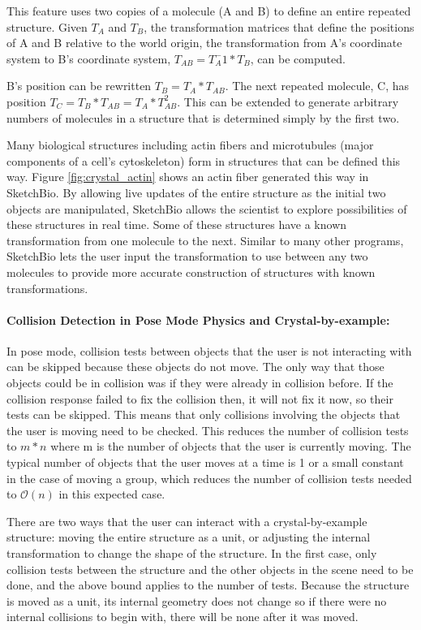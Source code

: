 \documentclass[twocolumn]{bmcart}%
\begin{document}
This feature uses two copies of a molecule (A and B) to define an entire repeated structure.
Given $T_A$ and $T_B$, the transformation matrices that define the positions of A and B relative to the world origin, the transformation from A's coordinate system to B's coordinate system, $T_{AB} = T_A^-1*T_B$, can be computed.

B's position can be rewritten $T_B = T_A*T_{AB}$.  The next repeated molecule, C, has position $T_C = T_B*T_{AB} = T_A*T_{AB}^2$.
This can be extended to generate arbitrary numbers of molecules in a structure that is determined simply by the first two.

Many biological structures including actin fibers and microtubules (major components of a cell's cytoskeleton) form in structures that can be defined this way.
Figure \ref{fig:crystal_actin} shows an actin fiber generated this way in SketchBio.
By allowing live updates of the entire structure as the initial two objects are manipulated, SketchBio allows the scientist to explore possibilities of these structures in real time.
Some of these structures have a known transformation from one molecule to the next.
Similar to many other programs, SketchBio lets the user input the transformation to use between any two molecules to provide more accurate construction of structures with known transformations.

\paragraph*{Collision Detection in Pose Mode Physics and Crystal-by-example:}
In pose mode, collision tests between objects that the user is not interacting with can be skipped because these objects do not move.
The only way that those objects could be in collision was if they were already in collision before.
If the collision response failed to fix the collision then, it will not fix it now, so their tests can be skipped.
This means that only collisions involving the objects that the user is moving need to be checked.
This reduces the number of collision tests to $m*n$ where m is the number of objects that the user is currently moving.
The typical number of objects that the user moves at a time is 1 or a small constant in the case of moving a group, which reduces the number of collision tests needed to $\mathcal{O}(n)$ in this expected case.

There are two ways that the user can interact with a crystal-by-example structure: moving the entire structure as a unit, or adjusting the internal transformation to change the shape of the structure.
In the first case, only collision tests between the structure and the other objects in the scene need to be done, and the above bound applies to the number of tests.
Because the structure is moved as a unit, its internal geometry does not change so if there were no internal collisions to begin with, there will be none after it was moved. 
\end{document}
